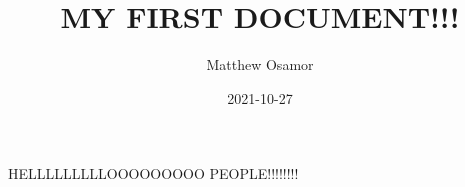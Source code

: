 \documentclass{article}
\title{MY FIRST DOCUMENT!!!}
\date{2021-10-27}
\author{Matthew Osamor}
\begin{document}
	\maketitle
	\newpage
	HELLLLLLLLLOOOOOOOOO
	PEOPLE!!!!!!!!
\end{document}
